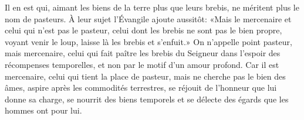 Il en est qui, aimant les biens de la terre plus que leurs brebis,
	ne méritent plus le nom de pasteurs.
À leur sujet l’Évangile ajoute aussitôt:
	«Mais le mercenaire et celui qui n’est pas le pasteur,
	celui dont les brebis ne sont pas le bien propre,
	voyant venir le loup, laisse là les brebis et s’enfuit.»
On n’appelle point pasteur, mais mercenaire,
	celui qui fait paître les brebis du Seigneur
	dans l’espoir des récompenses temporelles,
	et non par le motif d’un amour profond.
Car il est mercenaire, celui qui tient la place de pasteur,
	mais ne cherche pas le bien des âmes,
	aspire après les commodités terrestres,
	se réjouit de l’honneur que lui donne sa charge,
	se nourrit des biens temporels
	et se délecte des égards que les hommes ont pour lui.

